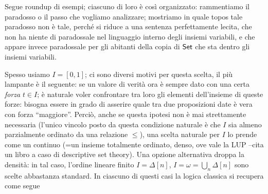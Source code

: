 \documentclass{amsart}
\begin{document}
Segue roundup di esempi; ciascuno di loro è così organizzato: rammentiamo il paradosso o il passo che vogliamo analizzare; mostriamo in quale topos tale paradosso non è tale, perché si riduce a una sentenza perfettamente lecita, che non ha niente di paradossale nel linguaggio interno degli insiemi variabili, e che appare invece paradossale per gli abitanti della copia di $\mathsf{Set}$ che sta dentro gli insiemi variabili.

Spesso usiamo $I=[0,1]$; ci sono diversi motivi per questa scelta, il più lampante è il seguente: se un valore di verità ora è sempre dato con una certa \emph{forza} $t\in I$; è naturale voler confrontare tra loro gli elementi dell'insieme di queste forze: bisogna essere in grado di asserire quale tra due proposizioni date è vera con forza ``maggiore''. Perciò, anche se questa ipotesi non è mai strettamente necessaria (l'unico vincolo posto da questa condizione naturale è che $I$ sia almeno parzialmente ordinato da una relazione $\le$), una scelta naturale per $I$ lo prende come un continuo (=un insieme totalmente ordinato, denso, ove vale la LUP --cita un libro a caso di descriptive set theory). Una opzione alternativa droppa la densità: in tal caso, l'ordine lineare finito $I=\Delta[n]$, $I=\omega = \bigcup_n \Delta[n]$ sono scelte abbastanza standard. In ciascuno di questi casi la logica classica si recupera come segue\todo{\dots}
\begin{center}
\end{center}
\end{document}
